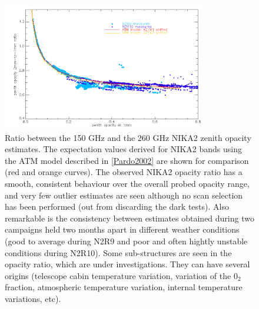 \begin{figure}[ht]
\begin{center}
  \includegraphics[width=0.8\textwidth]{Figures/opacity_tau1_tau2_byrun_ratio_N2R9_N2R10.png}
  \caption[Opacity ratio per campaigns]{Ratio between the 150 GHz and the 260 GHz NIKA2 zenith opacity
estimates. The expectation values derived for NIKA2 bands
using the ATM model described in \ref{Pardo2002} are shown for
comparison (red and orange curves). The observed NIKA2 opacity ratio
has a smooth, consistent behaviour over the overall probed opacity range,
and very few outlier estimates are seen although no scan selection has
been performed (out from discarding the dark tests). Also remarkable
is the consistency between estimates obtained during two campaigns
held two months apart in different weather conditions (good to average
during N2R9 and poor and often hightly unstable conditions during
N2R10). Some sub-structures are seen in the opacity ratio, which are
under investigations. They can have several origins (telescope cabin
temperature variation, variation of the $0_2$ fraction, atmospheric
temperature variation, internal temperature variations, etc).  
  }
  \label{fig:opacity_ratio_perrun}
\end{center}
\end{figure}


